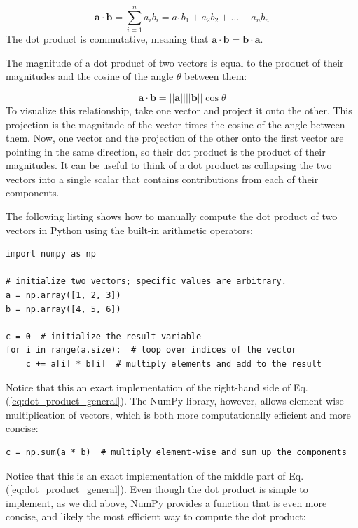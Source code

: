 \documentclass[12pt]{article}
\numberwithin{equation}{section}
\numberwithin{figure}{section}
\numberwithin{table}{section}
\begin{document}
\begin{equation}
  \mathbf{a} \cdot \mathbf{b} = \sum_{i=1}^{n} a_i b_i = a_1 b_1 + a_2 b_2 + \ldots + a_n b_n
  \label{eq:dot_product_general}
\end{equation}
The dot product is commutative, meaning that
$\mathbf{a} \cdot \mathbf{b} = \mathbf{b} \cdot \mathbf{a}$.

The magnitude of a dot product of two vectors is equal to the product of their
magnitudes and the cosine of the angle $\theta$ between them:

\begin{equation}
  \mathbf{a} \cdot \mathbf{b} = ||\mathbf{a}|| ||\mathbf{b}|| \cos{\theta}
\end{equation}
To visualize this relationship, take one vector and project it onto the other.
This projection is the magnitude of the vector times the cosine of the angle
between them.
Now, one vector and the projection of the other onto the first vector are
pointing in the same direction, so their dot product is the product of their
magnitudes.
It can be useful to think of a dot product as collapsing the two vectors into a
single scalar that contains contributions from each of their components.

The following listing shows how to manually compute the dot product of two
vectors in Python using the built-in arithmetic operators:

\begin{listing}[h]
\begin{verbatim}
import numpy as np

# initialize two vectors; specific values are arbitrary.
a = np.array([1, 2, 3])
b = np.array([4, 5, 6])

c = 0  # initialize the result variable
for i in range(a.size):  # loop over indices of the vector
    c += a[i] * b[i]  # multiply elements and add to the result
\end{verbatim}
\label{lst:dot_product_arithmetic}
\end{listing}
Notice that this an exact implementation of the right-hand side of Eq.
(\ref{eq:dot_product_general}).
The NumPy library, however, allows element-wise multiplication of vectors,
which is both more computationally efficient and more concise:

\begin{listing}[h]
\begin{verbatim}
c = np.sum(a * b)  # multiply element-wise and sum up the components
\end{verbatim}
\label{lst:dot_product_numpy}
\end{listing}
Notice that this is an exact implementation of the middle part of Eq.
(\ref{eq:dot_product_general}).
Even though the dot product is simple to implement, as we did above, NumPy
provides a function that is even more concise, and likely the most efficient
way to compute the dot product:
\end{document}
